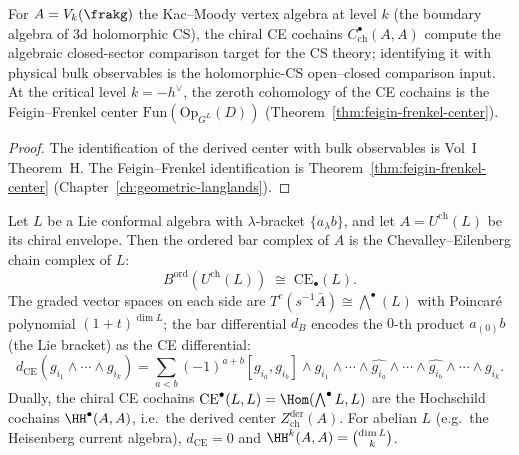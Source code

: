 \begin{proposition}
\label{prop:hcs-as-ce-cochains}
For $A = V_k(\frakg)$ the Kac--Moody vertex algebra at level $k$ (the
boundary algebra of 3d holomorphic CS), the chiral CE cochains
$C^\bullet_{\mathrm{ch}}(A, A)$ compute the algebraic closed-sector
comparison target for the CS theory; identifying it with physical bulk
observables is the holomorphic-CS open--closed comparison input. At
the critical level $k = -h^\vee$, the zeroth cohomology of the CE
cochains is the Feigin--Frenkel center
$\mathrm{Fun}(\mathrm{Op}_{G^L}(D))$
(Theorem~\ref{thm:feigin-frenkel-center}).
\end{proposition}

\begin{proof}
The identification of the derived center with bulk observables is Vol~I Theorem~H. The Feigin--Frenkel identification is Theorem~\ref{thm:feigin-frenkel-center} (Chapter~\ref{ch:geometric-langlands}).
\end{proof}

\begin{proposition}
\label{prop:bar-ce-identification}
Let $L$ be a Lie conformal algebra with $\lambda$-bracket $\{a_\lambda b\}$, and let $A = U^{\mathrm{ch}}(L)$ be its chiral envelope. Then the ordered bar complex of $A$ is the Chevalley--Eilenberg chain complex of $L$:
\[
 B^{\mathrm{ord}}(U^{\mathrm{ch}}(L)) \;\cong\; \mathrm{CE}_\bullet(L).
\]
The graded vector spaces on each side are $T^c(s^{-1}\bar{A}) \cong \bigwedge^\bullet(L)$ with Poincar\'e polynomial $(1+t)^{\dim L}$; the bar differential $d_B$ encodes the $0$\nobreakdash-th product $a_{(0)}b$ (the Lie bracket) as the CE differential:
\[
 d_{\mathrm{CE}}(g_{i_1} \wedge \cdots \wedge g_{i_k}) = \sum_{a < b} (-1)^{a+b} [g_{i_a}, g_{i_b}] \wedge g_{i_1} \wedge \cdots \wedge \widehat{g_{i_a}} \wedge \cdots \wedge \widehat{g_{i_b}} \wedge \cdots \wedge g_{i_k}.
\]
Dually, the chiral CE cochains $\mathrm{CE}^\bullet(L, L) = \Hom(\bigwedge^\bullet L, L)$ are the Hochschild cochains $\HH^\bullet(A, A)$, i.e.\ the derived center $Z^{\mathrm{der}}_{\mathrm{ch}}(A)$. For abelian $L$ (e.g.\ the Heisenberg current algebra), $d_{\mathrm{CE}} = 0$ and $\HH^k(A, A) = \binom{\dim L}{k}$.
\end{proposition}

